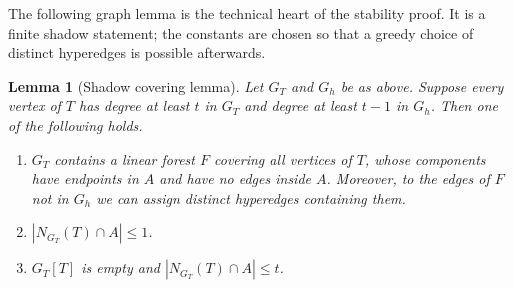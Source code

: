 \documentclass[12pt]{article}
\newtheorem{lemma}[theorem]{Lemma}
\begin{document}
The following graph lemma is the technical heart of the stability proof.
It is a finite shadow statement; the constants are chosen so that a greedy
choice of distinct hyperedges is possible afterwards.

\begin{lemma}[Shadow covering lemma]\label{lem:shadow}
Let $G_T$ and $G_h$ be as above.  Suppose every vertex of $T$ has degree
at least $t$ in $G_T$ and degree at least $t-1$ in $G_h$.  Then one of the
following holds.
\begin{enumerate}[label=(\roman*)]
\item $G_T$ contains a linear forest $F$ covering all vertices of $T$,
whose components have endpoints in $A$ and have no edges inside $A$.
Moreover, to the edges of $F$ not in $G_h$ 
we can assign distinct hyperedges containing them.
\item $|N_{G_T}(T)\cap A|\le 1$.
\item $G_T[T]$ is empty and $|N_{G_T}(T)\cap A|\le t$.
\end{enumerate}
\end{lemma}
\end{document}

